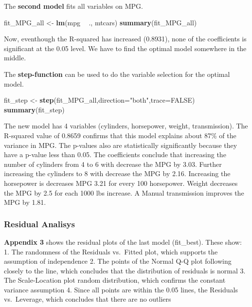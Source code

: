 \documentclass[]{article}
\newenvironment{Shaded}{\begin{snugshade}}{\end{snugshade}}
\newcommand{\KeywordTok}[1]{\textcolor[rgb]{0.13,0.29,0.53}{\textbf{#1}}}
\newcommand{\DataTypeTok}[1]{\textcolor[rgb]{0.13,0.29,0.53}{#1}}
\newcommand{\StringTok}[1]{\textcolor[rgb]{0.31,0.60,0.02}{#1}}
\newcommand{\OtherTok}[1]{\textcolor[rgb]{0.56,0.35,0.01}{#1}}
\newcommand{\OperatorTok}[1]{\textcolor[rgb]{0.81,0.36,0.00}{\textbf{#1}}}
\newcommand{\NormalTok}[1]{#1}
\begin{document}
The \textbf{second model} fits all variables on MPG.

\begin{Shaded}
\begin{Highlighting}[]
\NormalTok{fit_MPG_all <-}\StringTok{ }\KeywordTok{lm}\NormalTok{(mpg }\OperatorTok{~}\StringTok{ }\NormalTok{., mtcars)}
\KeywordTok{summary}\NormalTok{(fit_MPG_all)}
\end{Highlighting}
\end{Shaded}

Now, eventhough the R-squared has increased (0.8931), none of the
coefficients is significant at the 0.05 level. We have to find the
optimal model somewhere in the middle.

The \textbf{step-function} can be used to do the variable selection for
the optimal model.

\begin{Shaded}
\begin{Highlighting}[]
\NormalTok{fit_step <-}\StringTok{ }\KeywordTok{step}\NormalTok{(fit_MPG_all,}\DataTypeTok{direction=}\StringTok{"both"}\NormalTok{,}\DataTypeTok{trace=}\OtherTok{FALSE}\NormalTok{)}
\KeywordTok{summary}\NormalTok{(fit_step)}
\end{Highlighting}
\end{Shaded}

The new model has 4 variables (cylinders, horsepower, weight,
transmission). The R-squared value of 0.8659 confirms that this model
explains about 87\% of the variance in MPG. The p-values also are
statistically significantly because they have a p-value less than 0.05.
The coefficients conclude that increasing the number of cylinders from 4
to 6 with decrease the MPG by 3.03. Further increasing the cylinders to
8 with decrease the MPG by 2.16. Increasing the horsepower is decreases
MPG 3.21 for every 100 horsepower. Weight decreases the MPG by 2.5 for
each 1000 lbs increase. A Manual transmission improves the MPG by 1.81.

\subsubsection{Residual Analisys}\label{residual-analisys}

\textbf{Appendix 3} shows the residual plots of the last model
(fit\_best). These show: 1. The randomness of the Residuals vs.~Fitted
plot, which supports the assumption of independence 2. The points of the
Normal Q-Q plot following closely to the line, which concludes that the
distribution of residuals is normal 3. The Scale-Location plot random
distribution, which confirms the constant variance assumption 4. Since
all points are within the 0.05 lines, the Residuals vs.~Leverage, which
concludes that there are no outliers
\end{document}
